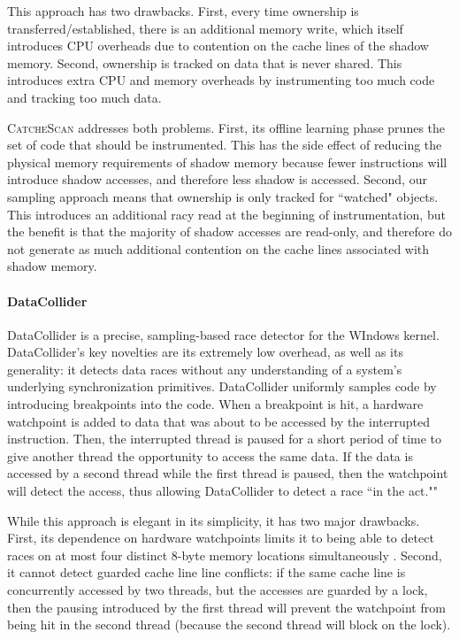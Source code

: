 \documentclass{sig-alternate}
\newcommand{\TextToolname}{CatcheScan}
\newcommand{\Toolname}{\textsc{\TextToolname{}}}
\begin{document}
This approach has two drawbacks. First, every time ownership is transferred/established, there is an additional
memory write, which itself introduces CPU overheads due to contention on the cache lines of the shadow memory. Second,
ownership is tracked on data that is never shared. This introduces extra CPU and memory overheads by instrumenting
too much code and tracking too much data.

\Toolname{} addresses both problems. First, its offline learning phase prunes the set of code that should be instrumented.
This has the side effect of reducing the physical memory requirements of shadow memory because fewer instructions will
introduce shadow accesses, and therefore less shadow is accessed. Second, our sampling approach means that ownership
is only tracked for ``watched" objects. This introduces an additional racy read at the beginning of instrumentation, but the
benefit is that the majority of shadow accesses are read-only, and therefore do not generate as much additional contention
on the cache lines associated with shadow memory.

\paragraph{DataCollider}
DataCollider \cite{DataCollider} is a precise, sampling-based race detector for the WIndows kernel. DataCollider's key
novelties are its extremely low overhead, as well as its generality: it detects data races without any understanding of
a system's underlying synchronization primitives. DataCollider uniformly samples code by introducing breakpoints into the code.
When a breakpoint is hit, a hardware watchpoint is added to data that was about to be accessed by the interrupted instruction.
Then, the interrupted thread is paused for a short period of time to give another thread the opportunity to access the
same data. If the data is accessed by a second thread while the first thread is paused, then the watchpoint will detect the
access, thus allowing DataCollider to detect a race ``in the act."" 

While this approach is elegant in its simplicity, it has two major drawbacks. First, its dependence on hardware watchpoints
limits it to being able to detect races on at most four distinct 8-byte memory locations simultaneously \cite{IntelSDManual}.
Second, it cannot detect guarded cache line line conflicts: if the same cache line is concurrently accessed by two threads, but
the accesses are guarded by a lock, then the pausing introduced by the first thread will prevent the watchpoint from being hit
in the second thread (because the second thread will block on the lock).
\end{document}
